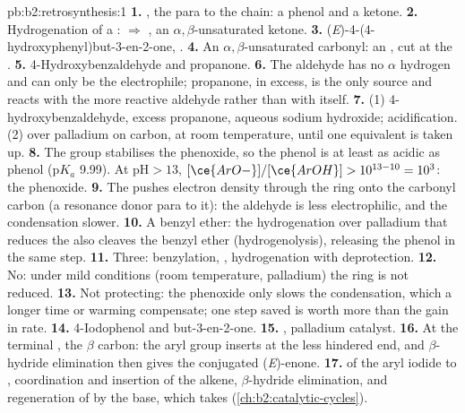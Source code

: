 \begin{solution}{pb:b2:retrosynthesis:1}
\textbf{1.} , the  para to the chain: a phenol and a ketone.
\textbf{2.} Hydrogenation of a :  $\Rightarrow$ , an
$\alpha,\beta$-unsaturated ketone.
\textbf{3.} (\textit{E})-4-(4-hydroxyphenyl)but-3-en-2-one, .
\textbf{4.} An $\alpha,\beta$-unsaturated carbonyl: an , cut at the .
\textbf{5.} 4-Hydroxybenzaldehyde and propanone.
\textbf{6.} The aldehyde has no $\alpha$ hydrogen and can only be the electrophile; propanone, in
excess, is the only  source and reacts with the more reactive aldehyde rather than with itself.
\textbf{7.} (1) 4-hydroxybenzaldehyde, excess propanone, aqueous sodium hydroxide; acidification. (2)
 over palladium on carbon, at room temperature, until one equivalent is taken up.
\textbf{8.} The  group stabilises the phenoxide, so the phenol is at least as acidic as phenol
($\mathrm pK_a$ 9.99). At $\mathrm{pH} > 13$, $[\ce{ArO-}]/[\ce{ArOH}] > 10^{13-10} = 10^3$: the
phenoxide.
\textbf{9.} The  pushes electron density through the ring onto the carbonyl carbon (a
resonance donor para to it): the aldehyde is less electrophilic, and the condensation slower.
\textbf{10.} A benzyl ether: the hydrogenation over palladium that reduces the  also cleaves
the benzyl ether (hydrogenolysis), releasing the phenol in the same step.
\textbf{11.} Three: benzylation, , hydrogenation with deprotection.
\textbf{12.} No: under mild conditions (room temperature, palladium) the  ring is not reduced.
\textbf{13.} Not protecting: the phenoxide only slows the condensation, which a longer time or warming
compensate; one step saved is worth more than the gain in rate.
\textbf{14.} 4-Iodophenol and but-3-en-2-one.
\textbf{15.} , palladium catalyst.
\textbf{16.} At the terminal , the $\beta$ carbon: the aryl group inserts at the less hindered
end, and $\beta$-hydride elimination then gives the conjugated (\textit{E})-enone.
\textbf{17.}  of the aryl iodide to , coordination and insertion of the
alkene, $\beta$-hydride elimination, and regeneration of  by the base, which takes 
(\cref{ch:b2:catalytic-cycles}).

\end{solution}
